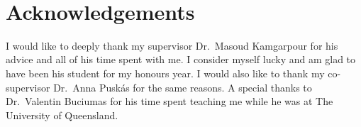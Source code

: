 \documentclass[11pt]{amsart}
\theoremstyle{remark}
\begin{document}
\tableofcontents
\setlength{\parindent}{0pt} %
\setlength{\parskip}{2mm}
\newpage

\
\newpage

\section*{Acknowledgements}
I would like to deeply thank my supervisor Dr.\ Masoud Kamgarpour for his advice and all of his time spent with me. I consider myself lucky and am glad to have been his student for my honours year. I would also like to thank my co-supervisor Dr.\ Anna Puskás for the same reasons. A special thanks to Dr.\ Valentin Buciumas for his time spent teaching me while he was at The University of Queensland.
\newpage

\newpage



\clearpage


\clearpage


\clearpage


\clearpage
\end{document}
